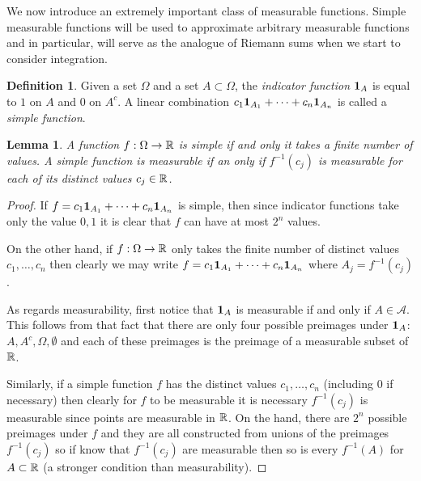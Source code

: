 \documentclass{amsart}
\newtheorem{lem}[thm]{Lemma}
\theoremstyle{remark}
\theoremstyle{definition}
\newtheorem{defn}[thm]{Definition}
\begin{document}
We now introduce an extremely important class of measurable
functions.  Simple measurable functions will be used to approximate
arbitrary measurable functions and in particular, will serve as the
analogue of Riemann sums when we start to consider integration.

\begin{defn}Given a set $\Omega$ and a set $A
  \subset \Omega$, the \emph{indicator function} $\textbf{1}_{A}$ is
  equal to $1$ on $A$ and $0$ on $A^c$.  A linear combination $c_1
  \textbf{1}_{A_1} + \cdots + c_n \textbf{1}_{A_n}$ is called
  a \emph{simple function}.
\end{defn}

\begin{lem}\label{SimpleFunctions}A function $f : \Omega \to \mathbb{R}$ is simple if and only it
  takes a finite number of values.  A simple function is measurable if
  an only if $f^{-1}(c_j)$ is measurable for each of its distinct
  values $c_j \in \mathbb{R}$.
\end{lem}
\begin{proof}
If $f = c_1  \textbf{1}_{A_1} + \cdots + c_n \textbf{1}_{A_n}$
is simple, then since indicator functions take only the value ${0,1}$
it is clear that $f$ can have at most $2^n$ values.

On the other hand, if $f : \Omega \to \mathbb{R}$ only takes the finite
number of distinct values $c_1, \dots, c_n$ then clearly we may write 
$f = c_1  \textbf{1}_{A_1} + \cdots + c_n \textbf{1}_{A_n}$
where $A_j = f^{-1}(c_j)$.

As regards measurability, first notice that $\textbf{1}_{A}$ is
measurable if and only if $A \in  \mathcal{A}$.  This follows from
that fact that there are only four possible preimages under
$\textbf{1}_{A}$: $A, A^c, \Omega, \emptyset$ and each of these
preimages is the preimage of a measurable subset of $\mathbb{R}$.

Similarly, if a simple function $f$ has the distinct values $c_1, \dots,
c_n$ (including $0$ if necessary) then clearly for $f$ to be
measurable it is necessary $f^{-1}(c_j)$ is measurable since points
are measurable in $\mathbb{R}$.   On the hand, there are $2^n$ possible preimages under $f$ and they are all
constructed from unions of the preimages $f^{-1}(c_j)$ so if know that
$f^{-1}(c_j)$ are measurable then so is every $f^{-1}(A)$ for $A
\subset \mathbb{R}$ (a stronger condition than measurability).
\end{proof}
\end{document}
